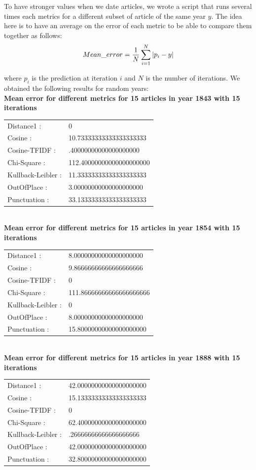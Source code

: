 To have stronger values when we date articles, we wrote a script that runs several times each metrics for a different subset of article of the same year $y$. The idea here is to have an average on the error of each metric to be able to compare them together as follows:
\[
 Mean\_ error = \frac{1}{N} \sum_{i=1}^N \arrowvert p_i - y \arrowvert
\]

where $p_i$ is the prediction at iteration $i$ and $N$ is the number of iterations. We obtained the following results for random years:\\

\newpage{}
\textbf{Mean error for different metrics for 15 articles in year 1843 with 15 iterations}\\
\begin{tabular}{p{3cm} p{5cm}}
Distance1 :& 0\\
Cosine :& 10.73333333333333333333\\
Cosine-TFIDF :& .40000000000000000000\\
Chi-Square :& 112.40000000000000000000\\
Kullback-Leibler :& 11.33333333333333333333\\
OutOfPlace :& 3.00000000000000000000\\
Punctuation :& 33.13333333333333333333\\
\end{tabular}\\
 
\textbf{Mean error for different metrics for 15 articles in year 1854 with 15 iterations}\\
\begin{tabular}{p{3cm} p{5cm}}
    Distance1 :& 8.00000000000000000000\\
    Cosine :& 9.86666666666666666666\\
    Cosine-TFIDF :& 0\\
    Chi-Square :& 111.86666666666666666666\\
    Kullback-Leibler :& 0\\
    OutOfPlace :& 8.00000000000000000000\\
    Punctuation :& 15.80000000000000000000\\
\end{tabular}\\
 
\textbf{Mean error for different metrics for 15 articles in year 1888 with 15 iterations}\\
\begin{tabular}{p{3cm} p{5cm}}
    Distance1 :& 42.00000000000000000000\\
    Cosine :& 15.13333333333333333333\\
    Cosine-TFIDF :& 0\\
    Chi-Square :& 62.40000000000000000000\\
    Kullback-Leibler :& .26666666666666666666\\
    OutOfPlace :& 42.00000000000000000000\\
    Punctuation :& 32.80000000000000000000\\
\end{tabular}\\
 
